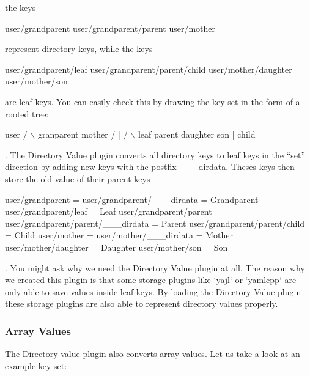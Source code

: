 the keys


\begin{DoxyCode}
user/grandparent
user/grandparent/parent
user/mother
\end{DoxyCode}


represent directory keys, while the keys


\begin{DoxyCode}
user/grandparent/leaf
user/grandparent/parent/child
user/mother/daughter
user/mother/son
\end{DoxyCode}


are leaf keys. You can easily check this by drawing the key set in the form of a rooted tree\+:


\begin{DoxyCode}
             user
      /               \(\backslash\)
  granparent        mother
  /      |          /    \(\backslash\)
leaf  parent    daughter son
         |
       child
\end{DoxyCode}


. The Directory Value plugin converts all directory keys to leaf keys in the “set” direction by adding new keys with the postfix {\ttfamily \+\_\+\+\_\+\+\_\+dirdata}. Theses keys then store the old value of their parent keys


\begin{DoxyCode}
user/grandparent                    =
user/grandparent/\_\_\_dirdata         = Grandparent
user/grandparent/leaf               = Leaf
user/grandparent/parent             =
user/grandparent/parent/\_\_\_dirdata  = Parent
user/grandparent/parent/child       = Child
user/mother                         =
user/mother/\_\_\_dirdata              = Mother
user/mother/daughter                = Daughter
user/mother/son                     = Son
\end{DoxyCode}


. You might ask why we need the Directory Value plugin at all. The reason why we created this plugin is that some storage plugins like \hyperlink{autotoc_md835_src_plugins_yajl_README_md}{`yajl`} or \hyperlink{autotoc_md835_src_plugins_yajl_README_md}{`yamlcpp`} are only able to save values inside leaf keys. By loading the Directory Value plugin these storage plugins are also able to represent directory values properly.\hypertarget{autotoc_md172_autotoc_md174}{}\subsubsection{Array Values}\label{autotoc_md172_autotoc_md174}
The Directory value plugin also converts array values. Let us take a look at an example key set\+:


